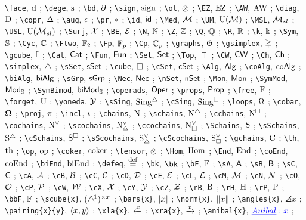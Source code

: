 \verb|\face|, $\operatorname{d}$ ; 
\verb|\dege|, $\operatorname{s}$ ; 
\verb|\bd|, $\operatorname{\partial}$ ; 
\verb|\sign|, $\operatorname{sign}$ ; 
\verb|\ot|, $\otimes$ ; 
\verb|\EZ|, $\operatorname{EZ}$ ; 
\verb|\AW|, $\operatorname{AW}$ ; 
\verb|\diag|, $\mathrm{D}$ ; 
\verb|\copr|, $\operatorname{\Delta}$ ; 
\verb|\aug|, $\operatorname{\epsilon}$ ; 
\verb|\pr|, $\operatorname{\ast}$ ; 
\verb|\id|, $\mathsf{id}$ ; 
\verb|\Med|, $\mathcal{M}$ ; 
\verb|\UM|, ${\operatorname{U}(\mathcal{M})}$ ; 
\verb|\MSL|, ${\mathcal{M}_{sl}}$ ; 
\verb|\USL|, ${\operatorname{U}(\mathcal{M}_{sl})}$ ; 
\verb|\Surj|, $\mathcal{X}$ ; 
\verb|\BE|, $\mathcal{E}$ ; 
\verb|\N|, $\mathbb{N}$ ; 
\verb|\Z|, $\mathbb{Z}$ ; 
\verb|\Q|, $\mathbb{Q}$ ; 
\verb|\R|, $\mathbb{R}$ ; 
\verb|\k|, $\Bbbk$ ; 
\verb|\Sym|, $\mathbb{S}$ ; 
\verb|\Cyc|, $\mathbb{C}$ ; 
\verb|\Ftwo|, ${\mathbb{F}_2}$ ; 
\verb|\Fp|, ${\mathbb{F}_p}$ ; 
\verb|\Cp|, ${\mathbb{C}_p}$ ; 
\verb|\graphs|, $\mathfrak{G}$ ; 
\verb|\gsimplex|, $\mathbb{\Delta}$ ; 
\verb|\gcube|, $\mathbb{I}$ ; 
\verb|\Cat|, $\mathsf{Cat}$ ; 
\verb|\Fun|, $\mathsf{Fun}$ ; 
\verb|\Set|, $\mathsf{Set}$ ; 
\verb|\Top|, $\Top$ ; 
\verb|\CW|, $\mathsf{CW}$ ; 
\verb|\Ch|, $\mathsf{Ch}$ ; 
\verb|\simplex|, $\triangle$ ; 
\verb|\sSet|, $\mathsf{sSet}$ ; 
\verb|\cube|, $\square$ ; 
\verb|\cSet|, $\mathsf{cSet}$ ; 
\verb|\Alg|, $\mathsf{Alg}$ ; 
\verb|\coAlg|, $\mathsf{coAlg}$ ; 
\verb|\biAlg|, $\mathsf{biAlg}$ ; 
\verb|\sGrp|, $\mathsf{sGrp}$ ; 
\verb|\Nec|, $\mathsf{Nec}$ ; 
\verb|\nSet|, $\mathsf{nSet}$ ; 
\verb|\Mon|, $\mathsf{Mon}$ ; 
\verb|\SymMod|, $\mathsf{Mod}_{\mathbb{S}}$ ; 
\verb|\SymBimod|, $\mathsf{biMod}_{\mathbb{S}}$ ; 
\verb|\operads|, $\mathsf{Oper}$ ; 
\verb|\props|, $\mathsf{Prop}$ ; 
\verb|\free|, $\operatorname{F}$ ; 
\verb|\forget|, $\operatorname{U}$ ; 
\verb|\yoneda|, $\operatorname{\mathcal{Y}}$ ; 
\verb|\sSing|, $\operatorname{Sing^{\triangle}}$ ; 
\verb|\cSing|, $\operatorname{Sing^{\square}}$ ; 
\verb|\loops|, $\Omega$ ; 
\verb|\cobar|, $\operatorname{\mathbf{\Omega}}$ ; 
\verb|\proj|, $\operatorname{\pi}$ ; 
\verb|\incl|, $\operatorname{\iota}$ ; 
\verb|\chains|, $\operatorname{N}$ ; 
\verb|\schains|, $\operatorname{N^{\triangle}}$ ; 
\verb|\cchains|, $\operatorname{N^{\square}}$ ; 
\verb|\cochains|, $\operatorname{N^{\vee}}$ ; 
\verb|\scochains|, $\operatorname{N^{\vee}_{\triangle}}$ ; 
\verb|\ccochains|, $\operatorname{N^{\vee}_{\square}}$ ; 
\verb|\Schains|, $\operatorname{S}$ ; 
\verb|\sSchains|, $\operatorname{S^{\triangle}}$ ; 
\verb|\cSchains|, $\operatorname{S^{\square}}$ ; 
\verb|\sScochains|, $\operatorname{S^{\vee}_{\triangle}}$ ; 
\verb|\cScochains|, $\operatorname{S^{\vee}_{\square}}$ ; 
\verb|\gchains|, $\operatorname{C}$ ; 
\verb|\th|, $\mathrm{th}$ ; 
\verb|\op|, $\mathrm{op}$ ; 
\verb|\coker|, $\operatorname{coker}$ ; 
\verb|\tensor|, $\otimes$ ; 
\verb|\Hom|, $\mathrm{Hom}$ ; 
\verb|\End|, $\mathrm{End}$ ; 
\verb|\coEnd|, $\mathrm{coEnd}$ ; 
\verb|\biEnd|, $\mathrm{biEnd}$ ; 
\verb|\defeq|, $\stackrel{\mathrm{def}}{=}$ ; 
\verb|\bk|, $\bk$ ; 
\verb|\bF|, $\mathbb{F}$ ; 
\verb|\sA|, $\mathsf{A}$ ; 
\verb|\sB|, $\mathsf{B}$ ; 
\verb|\sC|, $\mathsf{C}$ ; 
\verb|\cA|, $\mathcal{A}$ ; 
\verb|\cB|, $\mathcal{B}$ ; 
\verb|\cC|, $\mathcal{C}$ ; 
\verb|\cD|, $\mathcal{D}$ ; 
\verb|\cE|, $\mathcal{E}$ ; 
\verb|\cL|, $\mathcal{L}$ ; 
\verb|\cM|, $\mathcal{M}$ ; 
\verb|\cN|, $\mathcal{N}$ ; 
\verb|\cO|, $\mathcal{O}$ ; 
\verb|\cP|, $\mathcal{P}$ ; 
\verb|\cW|, $\mathcal{W}$ ; 
\verb|\cX|, $\mathcal{X}$ ; 
\verb|\cY|, $\mathcal{Y}$ ; 
\verb|\cZ|, $\mathcal{Z}$ ; 
\verb|\rB|, $\mathrm{B}$ ; 
\verb|\rH|, $\mathrm{H}$ ; 
\verb|\rP|, $\mathrm{P}$ ; 
\verb|\bbF|, $\mathbb{F}$ ; 
\verb|\scube{x}|, $(\triangle^{\!1})^{\times x}$ ; 
\verb|\bars{x}|, $\lvert x\rvert$ ; 
\verb|\norm{x}|, $\lVert x\Vert$ ; 
\verb|\angles{x}|, $\angles{x}$ ; 
\verb|\pairing{x}{y}|, $\langle x, y\rangle$ ; 
\verb|\xla{x}|, $\xleftarrow{x}$ ; 
\verb|\xra{x}|, $\xrightarrow{x}$ ; 
\verb|\anibal{x}|, $\textcolor{blue}{\underline{Anibal}: x}$ ; 

